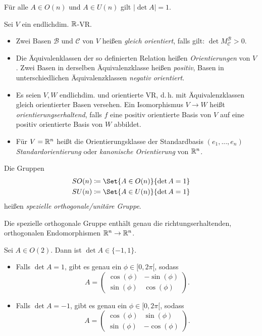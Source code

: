 \documentclass{cheat-sheet}
\newcommand{\BB}{\mathcal{B}}
\newcommand{\BC}{\mathcal{C}}
\begin{document}
\begin{bem}
  Für alle $A \in O(n)$ und $A \in U(n)$ gilt $| \det A | = 1$.
\end{bem}

\begin{defn}
Sei $V$ ein endlichdim. $\mathbb{R}$-VR.
\begin{itemize}
  \item Zwei Basen $\BB$ und $\BC$ von $V$ heißen \emph{gleich orientiert}, falls gilt: $\det M_{\BC}^{\BB} > 0$.
  \item Die Äquivalenklassen der so definierten Relation heißen \emph{Orientierungen} von $V$. Zwei Basen in derselben Äquivalenzklasse heißen \emph{positiv}, Basen in unterschiedlichen Äquivalenzklassen \emph{negativ orientiert}.
  \item Es seien $V, W$ endlichdim. und orientierte VR, d.\,h. mit Äquivalenzklassen gleich orientierter Basen versehen. Ein Isomorphismus $V \to W$ heißt \emph{orientierungserhaltend}, falls $f$ eine positiv orientierte Basis von $V$ auf eine positiv orientierte Basis von $W$ abbildet.
  \item Für $V = \mathbb{R}^n$ heißt die Orientierungsklasse der Standardbasis $(e_1, ..., e_n)$ \emph{Standardorientierung} oder \emph{kanonische Orientierung} von $\mathbb{R}^n$.
\end{itemize}
\end{defn}

\begin{defn}
Die Gruppen
\begin{align*}
SO(n) \coloneqq \Set{ A \in O(n) }{ \det A = 1 } \\
SU(n) \coloneqq \Set{ A \in U(n) }{ \det A = 1 }
\end{align*}
heißen \emph{spezielle orthogonale/unitäre Gruppe}.
\end{defn}

\begin{bem}
Die spezielle orthogonale Gruppe enthält genau die richtungserhaltenden, orthogonalen Endomorphismen $\mathbb{R}^n \to \mathbb{R}^n$.
\end{bem}

\begin{satz}
Sei $A \in O(2)$. Dann ist $\det A \in \{ -1, 1 \}$.
\begin{itemize}
  \item Falls $\det A = 1$, gibt es genau ein $\phi \in [0, 2 \pi[$, sodass
  \[ A = \begin{pmatrix} \cos(\phi) & - \sin(\phi) \\ \sin(\phi) & \cos(\phi) \end{pmatrix}. \]
  \item Falls $\det A = -1$, gibt es genau ein $\phi \in [0, 2 \pi[$, sodass
  \[ A = \begin{pmatrix} \cos(\phi) & \sin(\phi) \\ \sin(\phi) & - \cos(\phi) \end{pmatrix}. \]
\end{itemize}
\end{satz}
\end{document}
